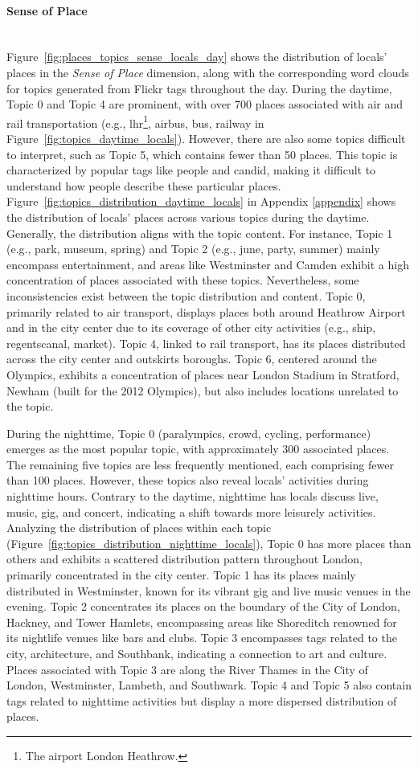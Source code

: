 \documentclass{article}
\newcommand{\subsubsubsection}[1]{\paragraph{#1}\mbox{}\\}
\theoremstyle{definition}
\theoremstyle{remark}
\begin{document}
\subsubsubsection{Sense of Place}
Figure~\ref{fig:places_topics_sense_locals_day} shows the distribution of locals' places in the \textit{Sense of Place} dimension, along with the corresponding word clouds for topics generated from Flickr tags throughout the day. During the daytime, Topic 0 and Topic 4 are prominent, with over 700 places associated with air and rail transportation (e.g., lhr\footnote{The airport London Heathrow.}, airbus, bus, railway in Figure~\ref{fig:topics_daytime_locals}). However, there are also some topics difficult to interpret, such as Topic 5, which contains fewer than 50 places. This topic is characterized by popular tags like people and candid, making it difficult to understand how people describe these particular places. Figure~\ref{fig:topics_distribution_daytime_locals} in Appendix \ref{appendix} shows the distribution of locals' places across various topics during the daytime. Generally, the distribution aligns with the topic content. For instance, Topic 1 (e.g., park, museum, spring) and Topic 2 (e.g., june, party, summer) mainly encompass entertainment, and areas like Westminster and Camden exhibit a high concentration of places associated with these topics. Nevertheless, some inconsistencies exist between the topic distribution and content. Topic 0, primarily related to air transport, displays places both around Heathrow Airport and in the city center due to its coverage of other city activities (e.g., ship, regentscanal, market). Topic 4, linked to rail transport, has its places distributed across the city center and outskirts boroughs. Topic 6, centered around the Olympics, exhibits a concentration of places near London Stadium in Stratford, Newham (built for the 2012 Olympics), but also includes locations unrelated to the topic.

During the nighttime, Topic 0 (paralympics, crowd, cycling, performance) emerges as the most popular topic, with approximately 300 associated places. The remaining five topics are less frequently mentioned, each comprising fewer than 100 places. However, these topics also reveal locals' activities during nighttime hours. Contrary to the daytime, nighttime has locals discuss live, music, gig, and concert, indicating a shift towards more leisurely activities. Analyzing the distribution of places within each topic (Figure~\ref{fig:topics_distribution_nighttime_locals}), Topic 0 has more places than others and exhibits a scattered distribution pattern throughout London, primarily concentrated in the city center. Topic 1 has its places mainly distributed in Westminster, known for its vibrant gig and live music venues in the evening. Topic 2 concentrates its places on the boundary of the City of London, Hackney, and Tower Hamlets, encompassing areas like Shoreditch renowned for its nightlife venues like bars and clubs. Topic 3 encompasses tags related to the city, architecture, and Southbank, indicating a connection to art and culture. Places associated with Topic 3 are along the River Thames in the City of London, Westminster, Lambeth, and Southwark. Topic 4 and Topic 5 also contain tags related to nighttime activities but display a more dispersed distribution of places.
\end{document}
